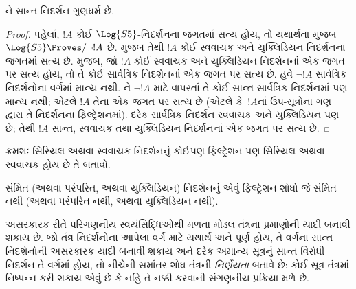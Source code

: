 \begin{cor}
  ને સાન્ત નિદર્શન ગુણધર્મ છે.
\end{cor}

\begin{proof}
  પહેલાં, $!A$ કોઈ $\Log{S5}$-નિદર્શનના જગતમાં સત્ય હોય,
  તો યથાર્થતા મુજબ $\Log{S5} \Proves/ \lnot !A$ છે.
   મુજબ તેથી $!A$ કોઈ
  સ્વવાચક અને યુક્લિડિયન નિદર્શનના જગતમાં સત્ય છે.
   મુજબ, જો $!A$ કોઈ સ્વવાચક
  અને યુક્લિડિયન નિદર્શનનાં એક જગત પર સત્ય હોય, તો તે કોઈ
  સાર્વત્રિક નિદર્શનનાં એક જગત પર સત્ય છે.
  હવે $\lnot !A$ સાર્વત્રિક નિદર્શનોના વર્ગમાં માન્ય નથી.
  ને $\lnot !A$ માટે વાપરતાં તે કોઈ
  સાન્ત સાર્વત્રિક નિદર્શનમાં પણ માન્ય નથી; એટલે $!A$ તેના એક
  જગત પર સત્ય છે (એટલે કે~$!A$નાં ઉપ-સૂત્રોના ગણ દ્વારા
  તે નિદર્શનના ફિલ્ટ્રેશનમાં). દરેક સાર્વત્રિક નિદર્શન
  સ્વવાચક અને યુક્લિડિયન પણ છે; તેથી $!A$ સાન્ત,
  સ્વવાચક તથા યુક્લિડિયન નિદર્શનનાં એક જગત પર સત્ય છે.
\end{proof}


\begin{prob}
  ક્રમશઃ સિરિયલ અથવા સ્વવાચક નિદર્શનનું કોઈપણ
  ફિલ્ટ્રેશન પણ સિરિયલ અથવા સ્વવાચક હોય છે તે બતાવો.
\end{prob}

\begin{prob}
  સંમિત (અથવા પરંપરિત, અથવા યુક્લિડિયન) નિદર્શનનું એવું
  ફિલ્ટ્રેશન શોધો જે સંમિત નથી (અથવા પરંપરિત નથી, અથવા
  યુક્લિડિયન નથી).
\end{prob}
\endgroup

\begingroup
\makeatletter{}\makeatother


\label{guunit:OLP-0457}

અસરકારક રીતે પરિગણનીય સ્વયંસિદ્ધિઓથી મળતા મોડલ તંત્રના
પ્રમાણોની યાદી બનાવી શકાય છે. જો તંત્ર નિદર્શનોના આપેલા વર્ગ માટે
યથાર્થ અને પૂર્ણ હોય, તે વર્ગના સાન્ત નિદર્શનોની અસરકારક યાદી
બનાવી શકાય અને દરેક અમાન્ય સૂત્રનું સાન્ત વિરોધી નિદર્શન તે
વર્ગમાં હોય, તો નીચેની સમાંતર શોધ તંત્રની \emph{નિર્ણેયતા}
બતાવે છે: કોઈ સૂત્ર તંત્રમાં નિષ્પન્ન કરી શકાય એવું છે કે નહિ
તે નક્કી કરવાની સંગણનીય પ્રક્રિયા મળે છે.


